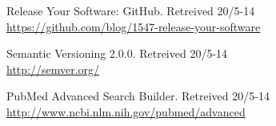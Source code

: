  Release Your Software: GitHub. Retreived 20/5-14\\
\url{https://github.com/blog/1547-release-your-software}

 Semantic Versioning 2.0.0. Retreived 20/5-14\\
\url{http://semver.org/}

 PubMed Advanced Search Builder. Retreived 20/5-14\\
\url{http://www.ncbi.nlm.nih.gov/pubmed/advanced}

